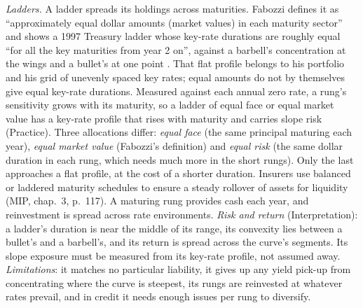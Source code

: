 \begin{qfmethod}
\emph{Ladders.} A ladder spreads its holdings across maturities. Fabozzi defines it as ``approximately equal dollar amounts (market values) in each maturity sector'' and shows a 1997 Treasury ladder whose key-rate durations are roughly equal ``for all the key maturities from year 2 on'', against a barbell's concentration at the wings and a bullet's at one point \citep[chap.~7, p.~207]{fixed-income-analysis-2007}. That flat profile belongs to his portfolio and his grid of unevenly spaced key rates; equal amounts do not by themselves give equal key-rate durations. Measured against each annual zero rate, a rung's sensitivity grows with its maturity, so a ladder of equal face or equal market value has a key-rate profile that rises with maturity and carries slope risk (Practice). Three allocations differ: \emph{equal face} (the same principal maturing each year), \emph{equal market value} (Fabozzi's definition) and \emph{equal risk} (the same dollar duration in each rung, which needs much more in the short rungs). Only the last approaches a flat profile, at the cost of a shorter duration. Insurers use balanced or laddered maturity schedules to ensure a steady rollover of assets for liquidity (MIP, chap.~3, p.~117). A maturing rung provides cash each year, and reinvestment is spread across rate environments. \emph{Risk and return} (Interpretation): a ladder's duration is near the middle of its range, its convexity lies between a bullet's and a barbell's, and its return is spread across the curve's segments. Its slope exposure must be measured from its key-rate profile, not assumed away. \emph{Limitations}: it matches no particular liability, it gives up any yield pick-up from concentrating where the curve is steepest, its rungs are reinvested at whatever rates prevail, and in credit it needs enough issues per rung to diversify.


\end{qfmethod}
